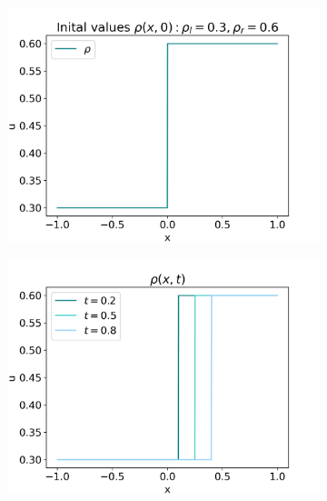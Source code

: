 \documentclass[10pt]{article}
\numberwithin{equation}{section}
\begin{document}
\begin{figure}
     \centering
     \begin{subfigure}[b]{0.3\textwidth}
         \centering
         \includegraphics[width=\textwidth]{Figures/Model/Plots/ForwShockIV.png}
     \end{subfigure}
     \hfill
     \begin{subfigure}[b]{0.3\textwidth}
         \centering
         \includegraphics[width=\textwidth]{Figures/Model/Plots/ForwShockAtTime.png}
     \end{subfigure}

\end{figure}
\end{document}
